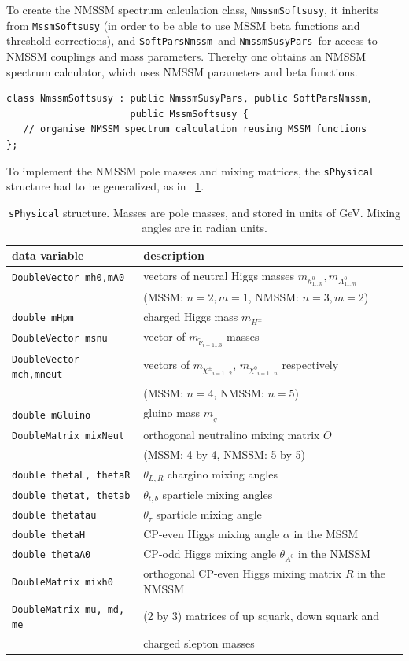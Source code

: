 \documentclass[final,3p,times]{elsarticle}
\def\code#1{\small{\tt #1}\normalsize}
\begin{document}
To create the NMSSM spectrum calculation class, \code{NmssmSoftsusy},
it inherits from \code{MssmSoftsusy} (in order to be able to use MSSM beta
functions and threshold corrections), and \code{SoftParsNmssm}~and
\code{NmssmSusyPars}~for access to NMSSM couplings and mass parameters.
Thereby one obtains an
NMSSM spectrum calculator, which uses NMSSM parameters and beta
functions.  
%
\begin{verbatim}
class NmssmSoftsusy : public NmssmSusyPars, public SoftParsNmssm, 
                      public MssmSoftsusy {
   // organise NMSSM spectrum calculation reusing MSSM functions
};
\end{verbatim}
%
To implement the NMSSM pole masses and mixing matrices, the
\code{sPhysical} structure had to be generalized, as in
\tablename~\ref{tab:sphys}.
%
\begin{table}
  \centering
  \begin{tabular}{ll}
    data variable & description \\ \hline
    \code{DoubleVector mh0,mA0} & vectors of neutral Higgs masses $m_{h^0_{1\ldots n}}, m_{A^0_{1\ldots m}}$\\
    & (MSSM: $n=2, m=1$, NMSSM: $n=3, m=2$) \\
    \code{double mHpm} & charged Higgs mass $m_{H^\pm}$ \\
    \code{DoubleVector msnu} & vector of $m_{{\tilde \nu}_{i=1 \ldots 3}}$ masses \\
    \code{DoubleVector mch,mneut} & vectors of $m_{{\chi^\pm}_{i=1 \ldots 2}}$, 
    $m_{{\chi^0}_{i=1 \ldots n}}$ respectively \\
    & (MSSM: $n=4$, NMSSM: $n=5$) \\
    \code{double mGluino} & gluino mass $m_{\tilde g}$ \\
    \code{DoubleMatrix mixNeut} & orthogonal neutralino mixing matrix $O$\\
    & (MSSM: 4 by 4, NMSSM: 5 by 5)\\
    \code{double thetaL, thetaR} & $\theta_{L, R}$ chargino mixing angles \\
    \code{double thetat, thetab} & $\theta_{t,b}$ sparticle mixing angles \\
    \code{double thetatau} & $\theta_{\tau}$ sparticle mixing angle \\
    \code{double thetaH} & CP-even Higgs mixing angle $\alpha$ in the MSSM \\
    \code{double thetaA0} & CP-odd Higgs mixing angle $\theta_{A^0}$ in the NMSSM \\
    \code{DoubleMatrix mixh0} & orthogonal CP-even Higgs mixing matrix $R$ in the NMSSM \\
    \code{DoubleMatrix mu, md, me} & (2 by 3) matrices of up squark, down squark
    and\\
    &  charged slepton masses \\
  \end{tabular}
  \caption{\label{tab:sphys}\code{sPhysical} structure. Masses are pole
    masses, and stored in units of GeV. Mixing angles are in radian
    units.}
\end{table}
\end{document}
